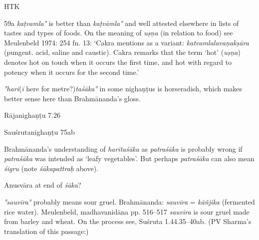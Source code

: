 \begin{ekdosis}
\begin{testimonia}[hp01_059]
HTK

\begin{versinnote}
\end{versinnote}

\end{testimonia}

\begin{philcomm}[hp01_059]
59a \emph{kaṭvamla°} is better than \emph{kaṭvāmla°} and well attested elsewhere in lists of tastes and types of foods.
On the meaning of \emph{uṣṇa} (in relation to food) see Meulenbeld 1974: 254 fn. 13: ‘Cakra mentions as a variant: \emph{katvamlalavaṇakṣāra} (pungent. acid, saline and caustic). Cakra remarks that the term `hot' (\emph{uṣṇa}) denotes hot on touch when it occurs the first time, and hot with regard to potency when it occurs for the second time.’

\emph{°hari}(\emph{ī} here for metre?)\emph{taśāka°} in some nighaṇṭus is horseradish, which makes better sense here than Brahmānanda’s gloss.

Rājanighaṇṭu 7.26

\begin{versinnote}
\end{versinnote}

Sauśrutanighaṇṭu 75ab
\begin{versinnote}
\end{versinnote}

Brahmānanda’s understanding of \emph{harītaśāka} as \emph{patraśāka} is probably wrong if \emph{patraśāka} was intended as ‘leafy vegetables’. But perhaps \emph{patraśāka} can also mean \emph{śigru} (note \emph{śākapattraḥ} above).

Anusvāra at end of \emph{śāka}?

\emph{°sauvīra°} probably means sour gruel.
Brahmānanda: \emph{sauvīra} = \emph{kāñjika} (fermented rice water).
Meulenbeld, madhavanidāna pp. 516–517
\emph{sauvīra} is sour gruel made from barley and wheat. On the process see, Suśruta 1.44.35--40ab.
(PV Sharma’s translation of this passage:)


\end{philcomm}
\end{ekdosis}
